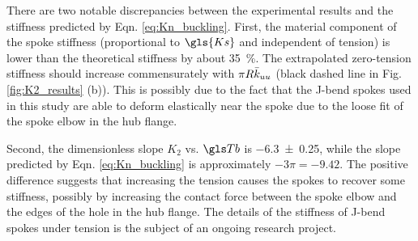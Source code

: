 \documentclass[\rootdir/thesis.tex]{subfiles}
\begin{document}
There are two notable discrepancies between the experimental results and the stiffness predicted by Eqn. \eqref{eq:Kn_buckling}. First, the material component of the spoke stiffness (proportional to $\gls{Ks}$ and independent of tension) is lower than the theoretical stiffness by about \SI{35}{\percent}. The extrapolated zero-tension stiffness should increase commensurately with $\pi R\bar{k}_{uu}$ (black dashed line in Fig. \ref{fig:K2_results} (b)). This is possibly due to the fact that the J-bend spokes used in this study are able to deform elastically near the spoke due to the loose fit of the spoke elbow in the hub flange.

Second, the dimensionless slope $K_2$ vs. $\Tb$ is \num{-6.3+-0.25}, while the slope predicted by Eqn. \eqref{eq:Kn_buckling} is approximately $-3\pi = -9.42$. The positive difference suggests that increasing the tension causes the spokes to recover some stiffness, possibly by increasing the contact force between the spoke elbow and the edges of the hole in the hub flange. The details of the stiffness of J-bend spokes under tension is the subject of an ongoing research project.
\end{document}
